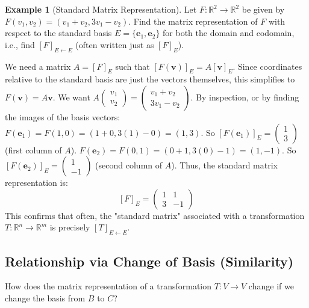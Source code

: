 \documentclass[11pt]{article}
\theoremstyle{definition}
\newtheorem{example}[theorem]{Example}
\theoremstyle{remark}
\begin{document}
\begin{example}[Standard Matrix Representation]
Let $F: \mathbb{R}^2 \to \mathbb{R}^2$ be given by $F(v_1, v_2) = (v_1 + v_2, 3v_1 - v_2)$. Find the matrix representation of $F$ with respect to the standard basis $E = \{\mathbf{e}_1, \mathbf{e}_2\}$ for both the domain and codomain, i.e., find $[F]_{E \leftarrow E}$ (often written just as $[F]_E$).

We need a matrix $A = [F]_E$ such that $[F(\mathbf{v})]_E = A [\mathbf{v}]_E$. Since coordinates relative to the standard basis are just the vectors themselves, this simplifies to $F(\mathbf{v}) = A \mathbf{v}$.
We want $A \begin{pmatrix} v_1 \\ v_2 \end{pmatrix} = \begin{pmatrix} v_1 + v_2 \\ 3v_1 - v_2 \end{pmatrix}$.
By inspection, or by finding the images of the basis vectors:
$F(\mathbf{e}_1) = F(1, 0) = (1+0, 3(1)-0) = (1, 3)$. So $[F(\mathbf{e}_1)]_E = \begin{pmatrix} 1 \\ 3 \end{pmatrix}$ (first column of $A$).
$F(\mathbf{e}_2) = F(0, 1) = (0+1, 3(0)-1) = (1, -1)$. So $[F(\mathbf{e}_2)]_E = \begin{pmatrix} 1 \\ -1 \end{pmatrix}$ (second column of $A$).
Thus, the standard matrix representation is:
\[ [F]_E = \begin{pmatrix} 1 & 1 \\ 3 & -1 \end{pmatrix} \]
This confirms that often, the "standard matrix" associated with a transformation $T:\mathbb{R}^n \to \mathbb{R}^m$ is precisely $[T]_{E \leftarrow E}$.
\end{example}

\subsection{Relationship via Change of Basis (Similarity)}

How does the matrix representation of a transformation $T: V \to V$ change if we change the basis from $B$ to $C$?
\end{document}
